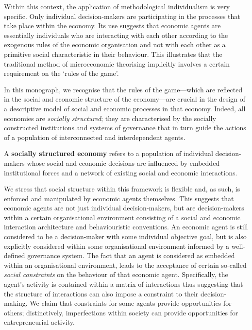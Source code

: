 Within this context, the application of methodological individualism is very specific. Only individual decision-makers are participating in the processes that take place within the economy. Its use suggests that economic agents are essentially individuals who are interacting with each other according to the exogenous rules of the economic organisation and not with each other as a primitive social characteristic in their behaviour. This illustrates that the traditional method of microeconomic theorising implicitly involves a certain requirement on the `rules of the game'.

\medskip \noindent In this monograph, we recognise that the rules of the game---which are reflected in the social and economic structure of the economy---are crucial in the design of a descriptive model of social and economic processes in that economy. Indeed, all economies are \emph{socially structured}; they are characterised by the socially constructed institutions and systems of governance that in turn guide the actions of a population of interconnected and interdependent agents.

\begin{definition}
A \textbf{socially structured economy} refers to a population of individual decision-makers whose social and economic decisions are influenced by embedded institutional forces and a network of existing social and economic interactions.
\end{definition}

We stress that social structure within this framework is flexible and, as such, is enforced and manipulated by economic agents themselves. This suggests that economic agents are not just individual decision-makers, but are decision-makers within a certain organisational environment consisting of a social and economic interaction architecture and behaviouristic conventions. An economic agent is still considered to be a decision-maker with some individual objective goal, but is also explicitly considered within some organisational environment informed by a well-defined governance system. The fact that an agent is considered as embedded within an organisational environment, leads to the acceptance of certain so-called \emph{social constraints} on the behaviour of that economic agent. Specifically, the agent's activity is contained within a matrix of interactions thus suggesting that the structure of interactions can also impose a constraint to their decision-making. We claim that constraints for some agents provide opportunities for others; distinctively, imperfections within society can provide opportunities for entrepreneurial activity.

